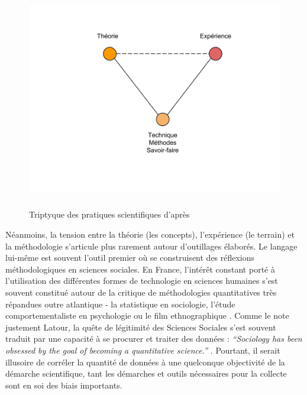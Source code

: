 \begin{figure}[htlp]
    \centering
    \includegraphics[width=5.0559in,height=3.7894in]{figures/chap3/chapitre3-img1.png}
    \caption[Triptyque des pratiques scientifiques]{Triptyque des pratiques scientifiques d'après \cite{Guichard2014}}
\end{figure}

Néanmoins, la tension entre la théorie (les concepts), l{\textquoteright}expérience (le terrain) et la méthodologie s{\textquoteright}articule plus rarement autour d{\textquoteright}outillages élaborés. Le langage lui-m\^eme est souvent l{\textquoteright}outil premier où se construisent des réflexions méthodologiques en sciences sociales. En France, l{\textquoteright}intér\^et constant porté à l{\textquoteright}utilisation des différentes formes de technologie en sciences humaines s{\textquoteright}est souvent constitué autour de la critique de méthodologies quantitatives très répandues outre atlantique - la statistique en sociologie, l{\textquoteright}étude comportementaliste en psychologie ou le film ethnographique \citep{Becker1996}. Comme le note justement Latour, la qu\^ete de légitimité des Sciences Sociales s{\textquoteright}est souvent traduit par une capacité à se procurer et traiter des données : \textit{{\textquotedblleft}Sociology has been obsessed by the goal of becoming a quantitative science.{\textquotedblright}} \citep{Latour2003}. Pourtant, il serait illusoire de corréler la quantité de données à une quelconque objectivité de la démarche scientifique, tant les démarches et outils nécessaires pour la collecte sont en soi des biais importants. 

